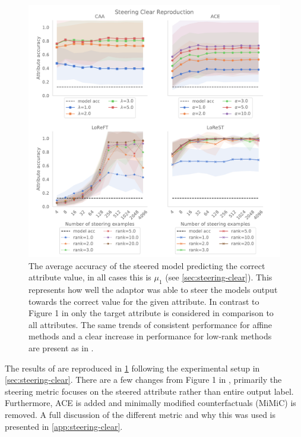 \begin{figure}
    \centering
    \captionsetup{width=\textwidth}
    \includegraphics[width=\textwidth]{figures/steering_clear.pdf}
    \caption{
        The average accuracy of the steered model predicting the correct attribute value, in all cases this is $\mu_1$ (see \cref{sec:steering-clear}).
        This represents how well the adaptor was able to steer the models output towards the correct value for the given attribute.
        In contrast to Figure 1 in \citet{steering-clear} only the target attribute is considered in comparison to all attributes.
        The same trends of consistent performance for affine methods and a clear increase in performance for low-rank methods are present as in \citet{steering-clear}.
    }
    \label{fig:steering-clear}
\end{figure}

The results of \cite{steering-clear} are reproduced in \cref{fig:steering-clear} following the experimental setup in \cref{sec:steering-clear}.
There are a few changes from Figure 1 in \cite{steering-clear}, primarily the steering metric focuses on the steered attribute rather than entire output label.
Furthermore, ACE is added and minimally modified counterfactuals (MiMiC) \citep{mimic} is removed.
A full discussion of the different metric and why this was used is presented in \cref{app:steering-clear}.

